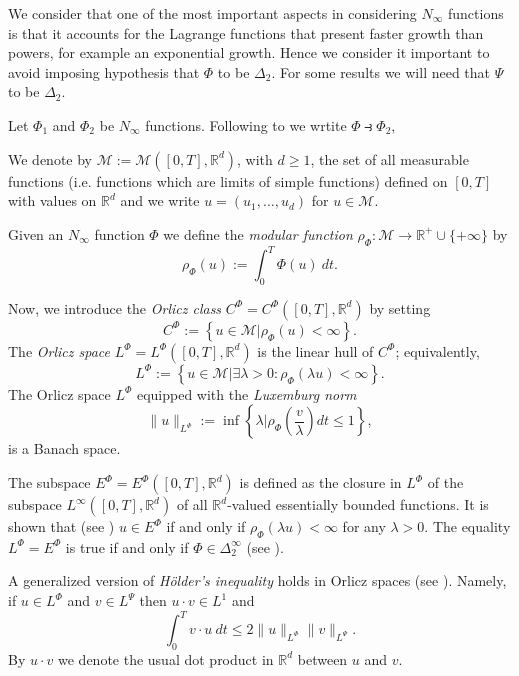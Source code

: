 \documentclass[twoside]{article}
\theoremstyle{remark}
\newcommand{\orlnor}{\|_{L^{\Phi}}}
\newcommand{\lphi}{L^{\Phi}}
\newcommand{\lpsi}{L^{\Psi}}
\newcommand{\ephi}{E^{\Phi}}
\newcommand{\claseor}{C^{\Phi}}
\newcommand{\rr}{\mathbb{R}}
\renewcommand{\leq}{\leqslant}
\renewcommand{\geq}{\geqslant}
\newcounter{example}[section]
\begin{document}
We consider that one of the most important aspects in considering $N_{\infty}$ functions is that it accounts for the Lagrange functions that present faster growth than powers, for example an exponential growth. Hence we consider it important to avoid imposing hypothesis that $\Phi$ to be $\Delta_2$. For some results we will need that $\Psi$ to be $\Delta_2$. 


Let $\Phi_1$ and $\Phi_2$ be   $N_{\infty}$ functions. Following to \cite{trudinger1974imbedding} we wrtite $\Phi\strictif\Phi_2$, 

 We denote by $\mathcal{M}:=\mathcal{M}\left([0,T],\rr^d\right)$, with $d\geq 1$,  the set of all measurable functions (i.e. functions which are limits of simple functions)  defined on $[0,T]$ with values on $\mathbb{R}^d$ and  we write $u=(u_1,\dots,u_d)$ for  $u\in \mathcal{M}$.

 Given  an $N_{\infty}$ function $\Phi$ we define the \emph{modular function} 
$\rho_{\Phi}:\mathcal{M}\to \mathbb{R}^+\cup\{+\infty\}$ by
\[\rho_{\Phi}(u):= \int_0^T \Phi(u)\ dt.\]

Now, we introduce the \emph{Orlicz class} $C^{\Phi}=C^{\Phi}\left([0,T],\rr^d\right)$   by setting
\begin{equation}\label{claseOrlicz}
  C^{\Phi}:=\left\{u\in \mathcal{M} | \rho_{\Phi}(u)< \infty \right\}.
\end{equation}
The \emph{Orlicz space} $\lphi=L^{\Phi}\left([0,T],\rr^d\right)$ is the linear hull of $\claseor$;
equivalently,
\begin{equation}\label{espacioOrlicz}
\lphi:=\left\{ u\in \mathcal{M}| \exists \lambda>0: \rho_{\Phi}(\lambda u) < \infty   \right\}.
\end{equation}
  The Orlicz space $\lphi$ equipped with the \emph{Luxemburg norm}
\[
\|  u  \orlnor:=\inf \left\{ \lambda\bigg| \rho_{\Phi}\left(\frac{v}{\lambda}\right) dt\leq 1\right\},
\]
is a Banach space. 


The subspace $\ephi=\ephi\left([0,T],\rr^d\right)$ is defined as the closure in $\lphi$ of the subspace $L^{\infty}\left([0,T],\rr^d\right)$ of all $\mathbb{R}^d$-valued essentially bounded functions. It is shown that  (see \cite[Thm. 5.1]{Orliczvectorial2005}) $u\in\ephi$  if and only if $\rho_{\Phi}(\lambda u)<\infty$ for any $\lambda>0$. The equality $\lphi=\ephi$ is true if and only if $\Phi\in\Delta_2^{\infty}$ (see \cite[Thm. 5.2]{Orliczvectorial2005}). 

A generalized version of \emph{H\"older's inequality} holds in Orlicz spaces (see \cite[Thm. 7.2]{Orliczvectorial2005}). Namely, if $u\in\lphi$ and $v\in\lpsi$ then $u\cdot v\in L^1$ and
\begin{equation}\label{holder}
\int_0^Tv\cdot u\ dt\leq 2 \|u\orlnor\|v\|_{L^{\Psi}}.
\end{equation}
By $u\cdot v$ we denote the usual dot product in $\mathbb{R}^{d}$ between $u$ and $v$.
\end{document}
